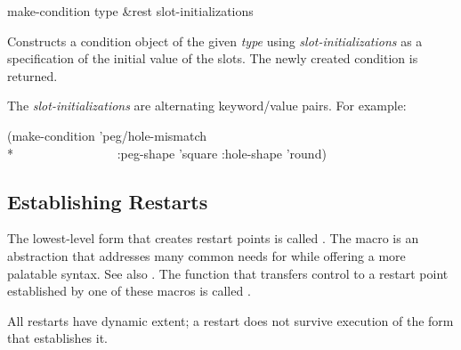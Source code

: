 \begin{defun}[Function]
make-condition type &rest slot-initializations

   Constructs a condition object of the given \emph{type} using \emph{slot-initializations}
   as a specification of the initial value of the slots. The newly created
   condition is returned.

   The \emph{slot-initializations} are alternating keyword/value pairs.
   For example:
\begin{lisp}
(make-condition 'peg/hole-mismatch \\*
~~~~~~~~~~~~~~~~:peg-shape 'square :hole-shape 'round)
\end{lisp}
\end{defun}


\subsection{Establishing Restarts}

The lowest-level form that creates restart points is called .
The  macro is an abstraction that addresses many common needs for
 while offering a more
palatable syntax. See also 
.
The function that transfers control to a restart
point established by one of these macros is called .

All restarts have dynamic extent; a restart does not survive execution of the form
that establishes it.

